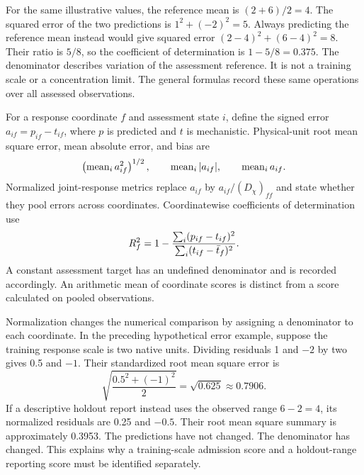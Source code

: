 For the same illustrative values, the reference mean is $(2+6)/2=4$. The squared error of the two predictions is $1^2+(-2)^2=5$. Always predicting the reference mean instead would give squared error $(2-4)^2+(6-4)^2=8$. Their ratio is $5/8$, so the coefficient of determination is $1-5/8=0.375$. The denominator describes variation of the assessment reference. It is not a training scale or a concentration limit. The general formulas record these same operations over all assessed observations.

For a response coordinate $f$ and assessment state $i$, define the signed error $a_{if}=p_{if}-t_{if}$, where $p$ is predicted and $t$ is mechanistic. Physical-unit root mean square error, mean absolute error, and bias are
\begin{equation}
\equationname{Coordinatewise root error, absolute error, and bias}
\left(\operatorname{mean}_i a_{if}^2\right)^{1/2},\qquad
\operatorname{mean}_i|a_{if}|,\qquad
\operatorname{mean}_i a_{if}.
\end{equation}
Normalized joint-response metrics replace $a_{if}$ by $a_{if}/(D_\chi)_{ff}$ and state whether they pool errors across coordinates. Coordinatewise coefficients of determination use
\begin{equation}
\equationname{Coefficient of determination for a plant-response coordinate}
R_f^2=1-\frac{\sum_i(p_{if}-t_{if})^2}{\sum_i(t_{if}-\bar t_f)^2}.
\end{equation}
A constant assessment target has an undefined denominator and is recorded accordingly. An arithmetic mean of coordinate scores is distinct from a score calculated on pooled observations.

Normalization changes the numerical comparison by assigning a denominator to each coordinate. In the preceding hypothetical error example, suppose the training response scale is two native units. Dividing residuals 1 and $-2$ by two gives 0.5 and $-1$. Their standardized root mean square error is
\[
\sqrt{\frac{0.5^2+(-1)^2}{2}}=\sqrt{0.625}\approx0.7906.
\]
If a descriptive holdout report instead uses the observed range $6-2=4$, its normalized residuals are 0.25 and $-0.5$. Their root mean square summary is approximately 0.3953. The predictions have not changed. The denominator has changed. This explains why a training-scale admission score and a holdout-range reporting score must be identified separately.


